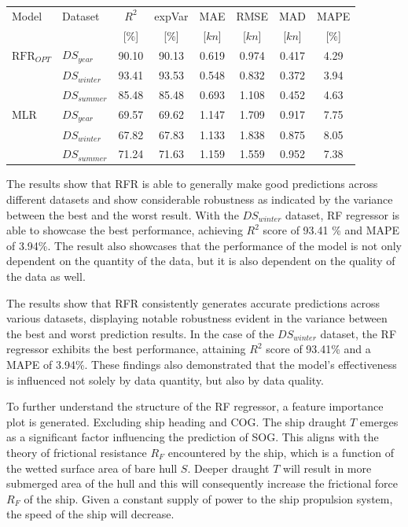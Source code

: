 \documentclass[]{interact}
\theoremstyle{plain}%
\theoremstyle{definition}
\theoremstyle{remark}
\begin{document}
\begin{table}
  {\begin{tabular}{ l l c c c c c c }
  \hline
  Model & Dataset & $R^2$ & expVar & MAE & RMSE & MAD & MAPE \\
  & & [$\%$] & [$\%$] & [$kn$] & [$kn$] & [$kn$] & [$\%$]  \\ 
  \hline
  $\text{RFR}_{OPT}$ & $DS_{year}$  & 90.10 & 90.13 & 0.619 & 0.974 & 0.417 & 4.29 \\
  & $DS_{winter}$ & 93.41 & 93.53 & 0.548 & 0.832 & 0.372 & 3.94 \\
  & $DS_{summer}$ & 85.48 & 85.48 & 0.693 & 1.108 & 0.452 & 4.63 \\
  MLR & $DS_{year}$ & 69.57 & 69.62 & 1.147 & 1.709 & 0.917 & 7.75 \\
  & $DS_{winter}$ & 67.82 & 67.83 & 1.133 & 1.838 & 0.875 & 8.05 \\
  & $DS_{summer}$ & 71.24 & 71.63 & 1.159 & 1.559 & 0.952 & 7.38 \\
  \hline
  \end{tabular}}
\label{tbl:testing_dataset_sog_result}
\end{table}

The results show that RFR is able to generally make good predictions across different datasets and show considerable robustness as indicated by the variance between the best and the worst result. With the $DS_{winter}$ dataset, RF regressor is able to showcase the best performance, achieving $R^2$ score of 93.41 \% and MAPE of 3.94\%. The result also showcases that the performance of the model is not only dependent on the quantity of the data, but it is also dependent on the quality of the data as well.

The results show that RFR consistently generates accurate predictions across various datasets, displaying notable robustness evident in the variance between the best and worst prediction results. In the case of the $DS_{winter}$ dataset, the RF regressor exhibits the best performance, attaining $R^2$ score of 93.41\% and a MAPE of 3.94\%. These findings also demonstrated that the model's effectiveness is influenced not solely by data quantity, but also by data quality.

To further understand the structure of the RF regressor, a feature importance plot is generated. Excluding ship heading and COG. The ship draught $T$ emerges as a significant factor influencing the prediction of SOG. This aligns with the theory of frictional resistance $R_F$ encountered by the ship, which is a function of the wetted surface area of bare hull $S$. Deeper draught $T$ will result in more submerged area of the hull and this will consequently increase the frictional force $R_F$ of the ship. Given a constant supply of power to the ship propulsion system, the speed of the ship will decrease.
\end{document}
